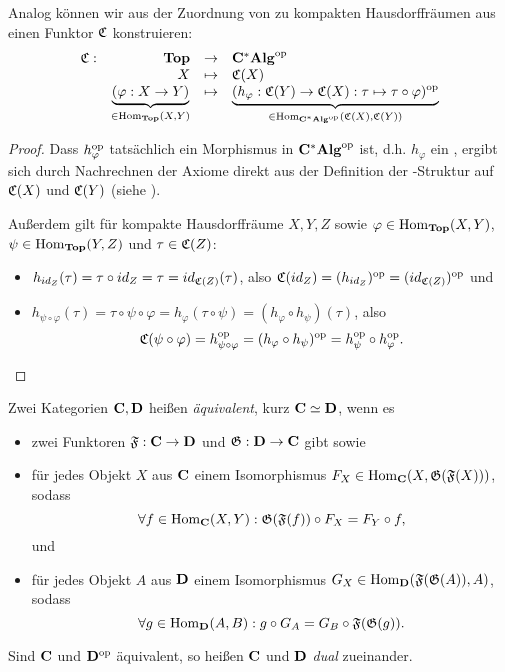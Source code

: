 \begin{bsp}\label{bsp:FunktorC}
Analog können wir aus der Zuordnung von \CAlgn{} zu kompakten Hausdorffräumen aus   einen Funktor $\mathfrak{C}$ konstruieren:
\[ \begin{array}{@{}rrcl@{}}
	\stetig: 	&\KatTop			&\to 		&\KatCAlg^\op													\\
				&X					&\mapsto 	&\stetig(X)													\\				
				&\underbrace{(\varphi:X \to Y)}_{\in \Hom_{\KatTop}(X,Y)} 	&\mapsto	
				&\underbrace{(h_\varphi: \stetig(Y) \to \stetig(X): \tau \mapsto \tau \circ \varphi)^\op}_{\in \Hom_{\KatCAlg^\op}(\stetig(X),\stetig(Y))}
\end{array} \]
\end{bsp}

\begin{proof}Dass $h_\varphi^{\mathrm{op}}$ tatsächlich ein Morphismus in $\mathbf{C^*Alg}^{\mathrm{op}}$ ist, d.h. $h_\varphi$ ein \CAlgHom{}, ergibt sich durch Nachrechnen der Axiome direkt aus der Definition der \CAlg-Struktur auf $\mathfrak{C}(X)$ und $\mathfrak{C}(Y)$ (siehe ).

Außerdem gilt für kompakte Hausdorffräume $X, Y, Z$ sowie $\varphi \in \mathrm{Hom}_{\mathbf{Top}}(X,Y)$, $\psi \in \mathrm{Hom}_{\mathbf{Top}}(Y,Z)$ und $\tau \in \mathfrak{C}(Z)$:
\begin{itemize}
	\item $h_{id_Z}(\tau) = \tau \circ id_Z = \tau = id_{\mathfrak{C}(Z)}(\tau)$, also $\mathfrak{C}(id_Z) = (h_{id_Z})^{\mathrm{op}} = (id_{\mathfrak{C}(Z)})^{\mathrm{op}}$ und
	\item $h_{\psi\circ \varphi}(\tau) = \tau\circ \psi \circ \varphi = h_\varphi(\tau\circ\psi) = (h_\varphi \circ h_\psi)(\tau)$, also 
		\[\mathfrak{C}(\psi \circ \varphi) = h_{\psi \circ \varphi}^{\mathrm{op}} = (h_\varphi \circ h_\psi)^{\mathrm{op}} = h_\psi^{\mathrm{op}} \circ h_\varphi^{\mathrm{op}}. \qedhere\]
\end{itemize}
\end{proof}

\begin{defn}[Kategorienäquivalenz]\label{defn:KatAEquiv}
Zwei Kategorien $\mathbf{C}, \mathbf{D}$ heißen \emph{äquivalent}, kurz $\mathbf{C} \simeq \mathbf{D}$, wenn es 
\begin{itemize}
	\item zwei Funktoren $\mathfrak{F}: \mathbf{C} \to \mathbf{D}$ und $\mathfrak{G}:\mathbf{D} \to \mathbf{C}$ gibt sowie
	\item für jedes Objekt $X$ aus $\mathbf{C}$ einem Isomorphismus $F_X \in \mathrm{Hom}_{\mathbf{C}}(X, \mathfrak{G}(\mathfrak{F}(X)))$, sodass
		\[\forall f \in \mathrm{Hom}_{\mathbf{C}}(X,Y): \mathfrak{G}(\mathfrak{F}(f))\circ F_X = F_Y \circ f,\]
	 und
	\item für jedes Objekt $A$ aus $\mathbf{D}$ einem Isomorphismus $G_X \in \mathrm{Hom}_{\mathbf{D}}(\mathfrak{F}(\mathfrak{G}(A)), A)$, sodass	
		\[\forall g \in \mathrm{Hom}_{\mathbf{D}}(A,B): g\circ G_A = G_B \circ \mathfrak{F}(\mathfrak{G}(g)).\]
\end{itemize}

Sind $\mathbf{C}$ und $\mathbf{D}^{\mathrm{op}}$ äquivalent, so heißen $\mathbf{C}$ und $\mathbf{D}$ \emph{dual} zueinander.
\end{defn}

